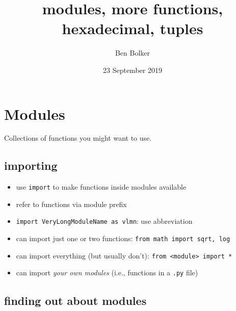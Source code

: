 \documentclass[]{tufte-handout}
\title{modules, more functions, hexadecimal, tuples}
\author{Ben Bolker}
\date{23 September 2019}
\providecommand{\tightlist}{%
  \setlength{\itemsep}{0pt}\setlength{\parskip}{0pt}}
\begin{document}
\maketitle




\section{Modules}\label{modules}

Collections of functions you might want to use.

\subsection{importing}\label{importing}

\begin{itemize}
\tightlist
\item
  use \texttt{import} to make functions inside modules available
\item
  refer to functions via module prefix
\item
  \texttt{import\ VeryLongModuleName\ as\ vlmn}: use abbreviation
\item
  can import just one or two functions:
  \texttt{from\ math\ import\ sqrt,\ log}
\item
  can import everything (but usually don't):
  \texttt{from\ \textless{}module\textgreater{}\ import\ *}
\item
  can import \emph{your own modules} (i.e., functions in a \texttt{.py}
  file)
\end{itemize}

\subsection{finding out about modules}\label{finding-out-about-modules}
\end{document}
